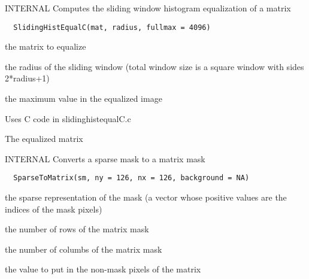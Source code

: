\documentclass[a4paper]{book}
\begin{document}
%
\begin{Description}\relax
INTERNAL Computes the sliding window histogram
equalization of a matrix
\end{Description}
%
\begin{Usage}
\begin{verbatim}
  SlidingHistEqualC(mat, radius, fullmax = 4096)
\end{verbatim}
\end{Usage}
%
\begin{Arguments}
\begin{ldescription}
\item[\code{mat}] the matrix to equalize

\item[\code{radius}] the radius of the sliding window (total
window size is a square window with sides 2*radius+1)

\item[\code{fullmax}] the maximum value in the equalized image
\end{ldescription}
\end{Arguments}
%
\begin{Details}\relax
Uses C code in slidinghistequalC.c
\end{Details}
%
\begin{Value}
The equalized matrix
\end{Value}
%
\begin{Description}\relax
INTERNAL Converts a sparse mask to a matrix mask
\end{Description}
%
\begin{Usage}
\begin{verbatim}
  SparseToMatrix(sm, ny = 126, nx = 126, background = NA)
\end{verbatim}
\end{Usage}
%
\begin{Arguments}
\begin{ldescription}
\item[\code{sm}] the sparse representation of the mask (a vector
whose positive values are the indices of the mask
pixels)

\item[\code{ny}] the number of rows of the matrix mask

\item[\code{nx}] the number of columbs of the matrix mask

\item[\code{background}] the value to put in the non-mask pixels
of the matrix
\end{ldescription}
\end{Arguments}
\end{document}
